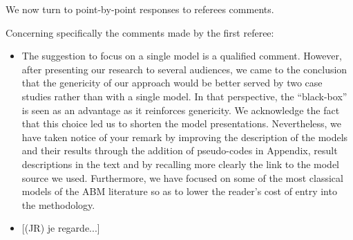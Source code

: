 \documentclass[11pt,a4paper,sans]{moderncv}        %
\begin{document}
\medskip



We now turn to point-by-point responses to referees comments.


\medskip


Concerning specifically the comments made by the first referee:

\begin{itemize}
	\item The suggestion to focus on a single model is a qualified comment. However, after presenting our research to several audiences, we came to the conclusion that the genericity of our approach would be better served by two case studies rather than with a single model. In that perspective, the ``black-box'' is seen as an advantage as it reinforces genericity. We acknowledge the fact that this choice led us to shorten the model presentations. Nevertheless, we have taken notice of your remark by improving the description of the models and their results through the addition of pseudo-codes in Appendix, result descriptions in the text and by recalling more clearly the link to the model source we used. Furthermore, we have focused on some of the most classical models of the ABM literature so as to lower the reader's cost of entry into the methodology.
   
   \item {} [(JR) je regarde...]
	

\end{itemize}
\end{document}
